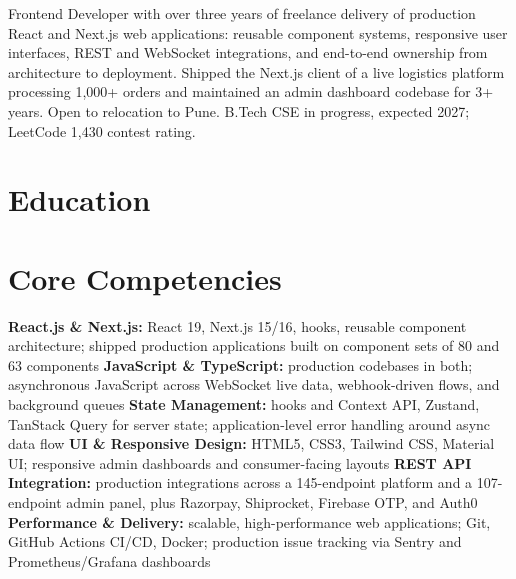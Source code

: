 \documentclass[11pt,a4paper,sans]{moderncv}
\begin{document}
\makecvtitle


\vspace{4pt}
\small{Frontend Developer with over three years of freelance delivery of production React and Next.js web applications: reusable component systems, responsive user interfaces, REST and WebSocket integrations, and end-to-end ownership from architecture to deployment. Shipped the Next.js client of a live logistics platform processing 1,000+ orders and maintained an admin dashboard codebase for 3+ years. Open to relocation to Pune. B.Tech CSE in progress, expected 2027; LeetCode 1,430 contest rating.}


\section{Education}
\vspace{1pt}


\section{Core Competencies}
\vspace{1pt}
\raggedright
\textbf{React.js \& Next.js:} React 19, Next.js 15/16, hooks, reusable component architecture; shipped production applications built on component sets of 80 and 63 components \textbar{}
\textbf{JavaScript \& TypeScript:} production codebases in both; asynchronous JavaScript across WebSocket live data, webhook-driven flows, and background queues \textbar{}
\textbf{State Management:} hooks and Context API, Zustand, TanStack Query for server state; application-level error handling around async data flow \textbar{}
\textbf{UI \& Responsive Design:} HTML5, CSS3, Tailwind CSS, Material UI; responsive admin dashboards and consumer-facing layouts \textbar{}
\textbf{REST API Integration:} production integrations across a 145-endpoint platform and a 107-endpoint admin panel, plus Razorpay, Shiprocket, Firebase OTP, and Auth0 \textbar{}
\textbf{Performance \& Delivery:} scalable, high-performance web applications; Git, GitHub Actions CI/CD, Docker; production issue tracking via Sentry and Prometheus/Grafana dashboards
\par\normalfont
\end{document}
